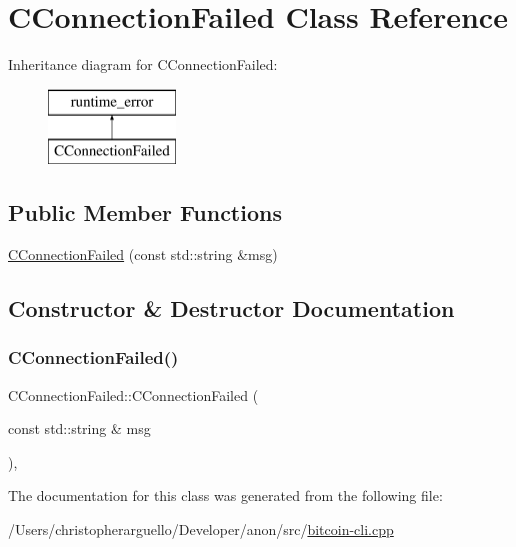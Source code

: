 \hypertarget{class_c_connection_failed}{}\section{C\+Connection\+Failed Class Reference}
\label{class_c_connection_failed}
Inheritance diagram for C\+Connection\+Failed\+:\begin{figure}[H]
\begin{center}
\leavevmode
\includegraphics[height=2.000000cm]{class_c_connection_failed}
\end{center}
\end{figure}
\subsection*{Public Member Functions}
\begin{DoxyCompactItemize}
\item 
\mbox{\hyperlink{class_c_connection_failed_abcc9db4386ec901f5159c44d939c82c5}{C\+Connection\+Failed}} (const std\+::string \&msg)
\end{DoxyCompactItemize}


\subsection{Constructor \& Destructor Documentation}
\mbox{\label{class_c_connection_failed_abcc9db4386ec901f5159c44d939c82c5}} 
\subsubsection{\texorpdfstring{C\+Connection\+Failed()}{CConnectionFailed()}}
{\footnotesize\ttfamily C\+Connection\+Failed\+::\+C\+Connection\+Failed (\begin{DoxyParamCaption}\item[{const std\+::string \&}]{msg }\end{DoxyParamCaption})\hspace{0.3cm}{\ttfamily [inline]}, {\ttfamily [explicit]}}



The documentation for this class was generated from the following file\+:\begin{DoxyCompactItemize}
\item 
/\+Users/christopherarguello/\+Developer/anon/src/\mbox{\hyperlink{bitcoin-cli_8cpp}{bitcoin-\/cli.\+cpp}}\end{DoxyCompactItemize}
